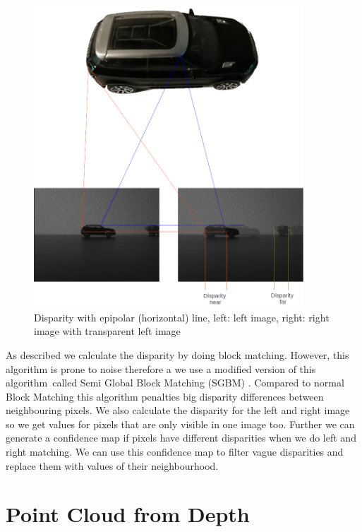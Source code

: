 \documentclass[11pt,a4paper,titlepage,oneside]{report}
\begin{document}
\begin{figure}[H]
  \begin{center}
		\includegraphics[width=0.9\textwidth]{img/disparity_concept.png}
  \end{center}
	\caption{Disparity with epipolar (horizontal) line, left: left image, right: right image with transparent left image}\label{fig:disparity}
\end{figure}

As described we calculate the disparity by doing block matching. However, this algorithm is prone to noise therefore a we use a modified version of this algorithm called Semi Global Block Matching (SGBM) \cite{sgbm}. Compared to normal Block Matching this algorithm penalties big disparity differences between neighbouring pixels. We also calculate the disparity for the left and right image so we get values for pixels that are only visible in one image too. Further we can generate a confidence map if pixels have different disparities when we do left and right matching. We can use this confidence map to filter vague disparities and replace them with values of their neighbourhood.

\section{Point Cloud from Depth}
\end{document}
